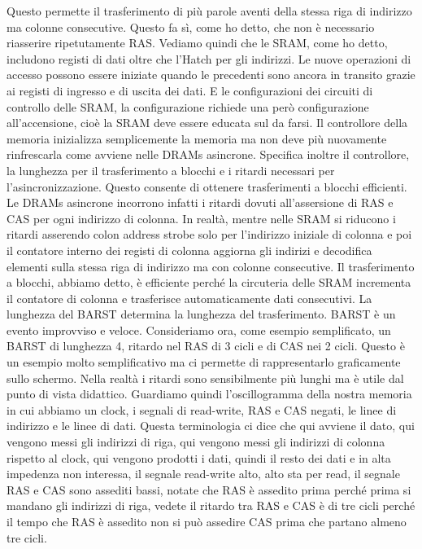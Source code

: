 Questo permette il trasferimento di più parole aventi della stessa riga di indirizzo ma colonne consecutive.
Questo fa sì, come ho detto, che non è necessario riasserire ripetutamente RAS.
Vediamo quindi che le SRAM, come ho detto, includono registi di dati oltre che l'Hatch per gli indirizzi.
Le nuove operazioni di accesso possono essere iniziate quando le precedenti sono ancora in transito grazie ai registi di ingresso e di uscita dei dati.
E le configurazioni dei circuiti di controllo delle SRAM, la configurazione richiede una però configurazione all'accensione, cioè la SRAM deve essere educata sul da farsi.
Il controllore della memoria inizializza semplicemente la memoria ma non deve più nuovamente rinfrescarla come avviene nelle DRAMs asincrone.
Specifica inoltre il controllore, la lunghezza per il trasferimento a blocchi e i ritardi necessari per l'asincronizzazione.
Questo consente di ottenere trasferimenti a blocchi efficienti.
Le DRAMs asincrone incorrono infatti i ritardi dovuti all'assersione di RAS e CAS per ogni indirizzo di colonna.
In realtà, mentre nelle SRAM si riducono i ritardi asserendo colon address strobe solo per l'indirizzo iniziale di colonna e poi il contatore interno dei registi di colonna aggiorna gli indirizi e decodifica elementi sulla stessa riga di indirizzo ma con colonne consecutive.
Il trasferimento a blocchi, abbiamo detto, è efficiente perché la circuteria delle SRAM incrementa il contatore di colonna e trasferisce automaticamente dati consecutivi.
La lunghezza del BARST determina la lunghezza del trasferimento.
BARST è un evento improvviso e veloce.
Consideriamo ora, come esempio semplificato, un BARST di lunghezza 4, ritardo nel RAS di 3 cicli e di CAS nei 2 cicli.
Questo è un esempio molto semplificativo ma ci permette di rappresentarlo graficamente sullo schermo.
Nella realtà i ritardi sono sensibilmente più lunghi ma è utile dal punto di vista didattico.
Guardiamo quindi l'oscillogramma della nostra memoria in cui abbiamo un clock, i segnali di read-write, RAS e CAS negati, le linee di indirizzo e le linee di dati.
Questa terminologia ci dice che qui avviene il dato, qui vengono messi gli indirizzi di riga, qui vengono messi gli indirizzi di colonna rispetto al clock, qui vengono prodotti i dati, quindi il resto dei dati e in alta impedenza non interessa, il segnale read-write alto, alto sta per read, il segnale RAS e CAS sono assediti bassi, notate che RAS è assedito prima perché prima si mandano gli indirizzi di riga, vedete il ritardo tra RAS e CAS è di tre cicli perché il tempo che RAS è assedito non si può assedire CAS prima che partano almeno tre cicli.
